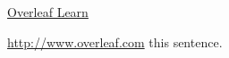 
\href{https://www.overleaf.com/learn}
\href{https://www.overleaf.com/learn}{Overleaf Learn} %

\url{http://www.overleaf.com}
\hypertarget{thesentence}{this sentence}.

